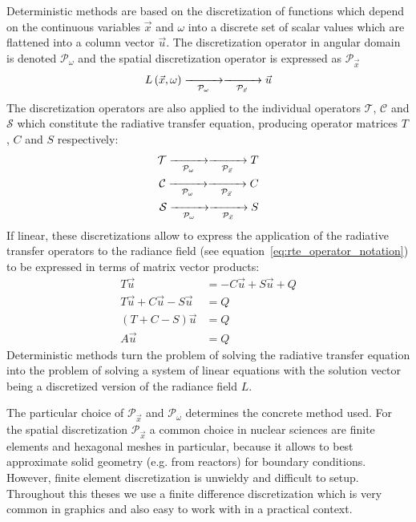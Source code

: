 Deterministic methods are based on the discretization of functions which depend on the continuous variables $\vec{x}$ and $\omega$ into a discrete set of scalar values which are flattened into a column vector $\vec{u}$. The discretization operator in angular domain is denoted $\mathcal{P}_\omega$ and the spatial discretization operator is expressed as $\mathcal{P}_{\vec{x}}$
\begin{align*}
L\left(\vec{x}, \omega\right)
\xrightarrow[\mathcal{P}_\omega]{\makebox[1cm]{}}
\xrightarrow[\mathcal{P}_{\vec{x}}]{\makebox[1cm]{}}
\vec{u}
\end{align*}
The discretization operators are also applied to the individual operators $\mathcal{T}$, $\mathcal{C}$ and $\mathcal{S}$ which constitute the radiative transfer equation, producing operator matrices $T$, $C$ and $S$ respectively:
\begin{align*}
\mathcal{T}
\xrightarrow[\mathcal{P}_\omega]{\makebox[1cm]{}}
\xrightarrow[\mathcal{P}_{\vec{x}}]{\makebox[1cm]{}}
T
\\
\mathcal{C}
\xrightarrow[\mathcal{P}_\omega]{\makebox[1cm]{}}
\xrightarrow[\mathcal{P}_{\vec{x}}]{\makebox[1cm]{}}
C
\\
\mathcal{S}
\xrightarrow[\mathcal{P}_\omega]{\makebox[1cm]{}}
\xrightarrow[\mathcal{P}_{\vec{x}}]{\makebox[1cm]{}}
S
\end{align*}
If linear, these discretizations allow to express the application of the radiative transfer operators to the radiance field (see equation~\ref{eq:rte_operator_notation}) to be expressed in terms of matrix vector products:
\begin{align*}
T\vec{u}&=-C\vec{u}+S\vec{u}+Q
\\
T\vec{u}+C\vec{u}-S\vec{u}&=Q
\\
(T+C-S)\vec{u}&=Q
\\
A\vec{u}&=Q
\end{align*}
Deterministic methods turn the problem of solving the radiative transfer equation into the problem of solving a system of linear equations with the solution vector being a discretized version of the radiance field $L$.

The particular choice of $\mathcal{P}_{\vec{x}}$ and $\mathcal{P}_\omega$ determines the concrete method used. For the spatial discretization $\mathcal{P}_{\vec{x}}$ a common choice in nuclear sciences are finite elements and hexagonal meshes in particular, because it allows to best approximate solid geometry (e.g. from reactors) for boundary conditions. However, finite element discretization is unwieldy and difficult to setup. Throughout this theses we use a finite difference discretization which is very common in graphics and also easy to work with in a practical context.

